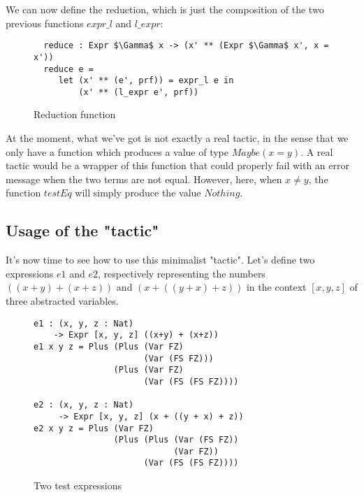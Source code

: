 We can now define the reduction, which is just the composition of the two previous functions $expr\_l$ and $l\_expr$:

\begin{figure}[H]
\figrule
\begin{center}
\begin{lstlisting}
  reduce : Expr $\Gamma$ x -> (x' ** (Expr $\Gamma$ x', x = x'))
  reduce e = 
     let (x' ** (e', prf)) = expr_l e in
         (x' ** (l_expr e', prf))
\end{lstlisting}
\end{center}
\caption{Reduction function}
\figrule
\end{figure}


At the moment, what we've got is not exactly a real tactic, in the sense that we only have a function which produces a value of type $Maybe (x = y)$. A real tactic would be a wrapper of this function that could properly fail with an error message when the two terms are not equal. However, here, when $x\ne y$, the function $testEq$ will simply produce the value $Nothing$. \\

\subsection{Usage of the "tactic"}

It's now time to see how to use this minimalist "tactic".
Let's define two expressions $e1$ and $e2$, respectively representing the numbers $((x + y) + (x + z))$ and $(x + ((y + x) + z))$ in the context $[x, y, z]$ of three abstracted variables.


\begin{figure}[H]
\figrule
\begin{center}
\begin{lstlisting}
e1 : (x, y, z : Nat) 
    -> Expr [x, y, z] ((x+y) + (x+z))
e1 x y z = Plus (Plus (Var FZ) 
                      (Var (FS FZ))) 
                (Plus (Var FZ) 
                      (Var (FS (FS FZ))))

e2 : (x, y, z : Nat) 
     -> Expr [x, y, z] (x + ((y + x) + z))
e2 x y z = Plus (Var FZ) 
                (Plus (Plus (Var (FS FZ)) 
                            (Var FZ)) 
                      (Var (FS (FS FZ))))
\end{lstlisting}
\end{center}
\caption{Two test expressions}
\figrule
\end{figure}

